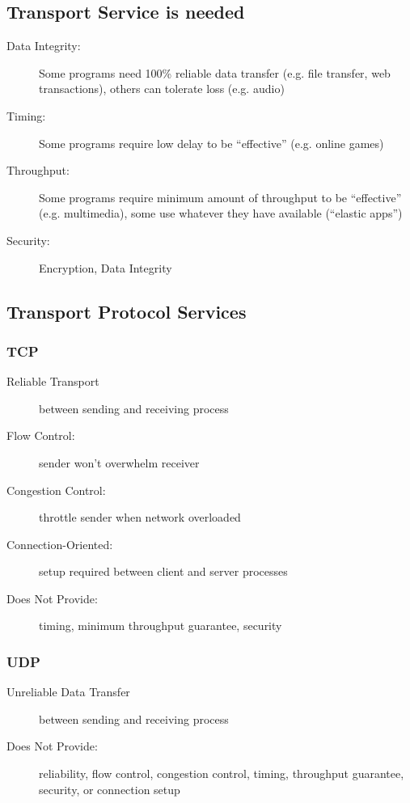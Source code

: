 \subsection{Transport Service is needed}
\begin{description}
	\item[Data Integrity:] Some programs need 100\% reliable data transfer (e.g. file transfer, web transactions), others can tolerate loss (e.g. audio)
	\item[Timing:] Some programs require low delay to be ``effective'' (e.g. online games)
	\item[Throughput:] Some programs require minimum amount of throughput to be ``effective'' (e.g. multimedia), some use whatever they have available (``elastic apps'')
	\item[Security:] Encryption, Data Integrity
\end{description}

\subsection{Transport Protocol Services}
\subsubsection{TCP}\label{sec:tcp}
\begin{description}
	\item[Reliable Transport] between sending and receiving process
	\item[Flow Control:] sender won't overwhelm receiver
	\item[Congestion Control:] throttle sender when network overloaded
	\item[Connection-Oriented:] setup required between client and server processes
	\item[Does Not Provide:] timing, minimum throughput guarantee, security
\end{description}

\subsubsection{UDP}\label{sec:udp}
\begin{description}
	\item[Unreliable Data Transfer] between sending and receiving process
	\item[Does Not Provide:] reliability, flow control, congestion control, timing, throughput guarantee, security, or connection setup
\end{description}


